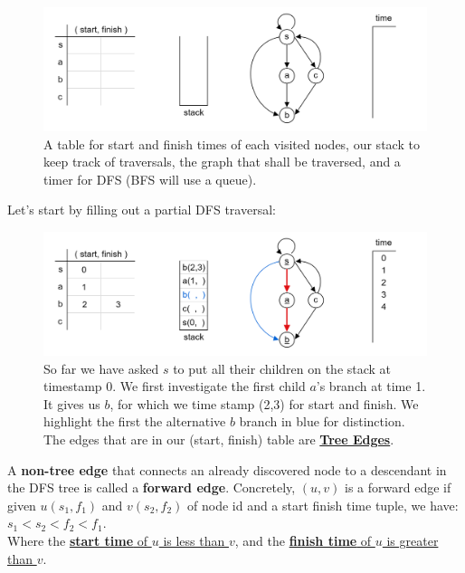 \begin{figure}[h]
    \begin{center}
    \includegraphics[width=1\textwidth]{./Sections/graphs/edges/eg_1.png}
    \end{center}
     \caption{A table for start and finish times of each visited nodes, our stack to keep track of traversals, the graph that shall be traversed, and a timer for DFS (BFS will use a queue).}
     \label{fig:edge_class}
  \end{figure}

\newpage 

\noindent
Let's start by filling out a partial DFS traversal:

\begin{figure}[h]
    \begin{center}
    \includegraphics[width=1\textwidth]{./Sections/graphs/edges/eg_2.png}
    \end{center}
     \caption{So far we have asked $s$ to put all their children on the stack at timestamp 0. We 
     first investigate the first child $a$'s branch at time 1. It gives us $b$, for which we time stamp (2,3) for start and finish. We highlight the first the alternative $b$ branch in blue for distinction.
     The edges that are in our (start, finish) table are \underline{\textbf{Tree Edges}}.}
     \label{fig:edge_class_2}
  \end{figure}
\noindent

\begin{Def}

    A \textbf{non-tree edge} that connects an already discovered node to a descendant in the DFS tree is called a \textbf{forward edge}.
    Concretely, $(u, v)$ is a forward edge if given $u(s_1,f_1)$ and $v(s_2,f_2)$ of node id and a start finish time tuple, we have: $s_1 < s_2 < f_2 < f_1$.\\
    Where the \underline{\textbf{start time} of $u$ is less than $v$}, and the \underline{\textbf{finish time} of $u$ is greater than $v$}.
\end{Def}

